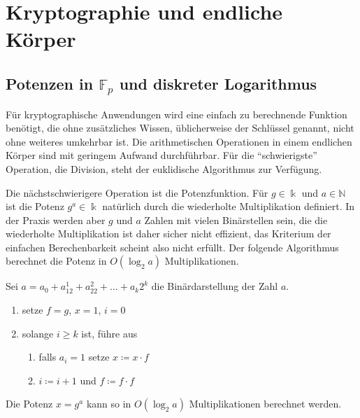 %
%
%

\section{Kryptographie und endliche Körper
\label{buch:section:kryptographie-und-endliche-koerper}}

\subsection{Potenzen in $\mathbb{F}_p$ und diskreter Logarithmus
\label{buch:subsection:potenzen-diskreter-logarithmus}}
Für kryptographische Anwendungen wird eine einfach zu berechnende
Funktion benötigt,
die ohne zusätzliches Wissen, üblicherweise der Schlüssel genannt,
nicht ohne weiteres umkehrbar ist.
Die arithmetischen Operationen in einem endlichen Körper sind
mit geringem Aufwand durchführbar.
Für die ``schwierigste'' Operation, die Division, steht der
euklidische Algorithmus zur Verfügung.

Die nächstschwierigere Operation ist die Potenzfunktion.
Für $g\in \Bbbk$ und $a\in\mathbb{N}$ ist die Potenz $g^a\in\Bbbk$
natürlich durch die wiederholte Multiplikation definiert.
In der Praxis werden aber $g$ und $a$ Zahlen mit vielen Binärstellen
sein, die die wiederholte Multiplikation ist daher sicher nicht
effizient, das Kriterium der einfachen Berechenbarkeit scheint
also nicht erfüllt.
Der folgende Algorithmus berechnet die Potenz in $O(\log_2 a)$
Multiplikationen.

\begin{algorithmus}
\label{buch:crypto:algo:divide-and-conquer}
Sei $a=a_0 + a_12^1 + a_22^2 + \dots + a_k2^k$ die Binärdarstellung
der Zahl $a$.
\begin{enumerate}
\item setze $f=g$, $x=1$, $i=0$
\label{divide-and-conquer-1}
\item solange $i\ge k$ ist, führe aus
\label{divide-and-conquer-2}
\begin{enumerate}
\item
\label{divide-and-conquer-3}
falls $a_i=1$ setze $x \coloneqq x \cdot f$
\item
\label{divide-and-conquer-4}
$i \coloneqq i+1$ und $f\coloneqq f\cdot f$
\end{enumerate}
\end{enumerate}
Die Potenz $x=g^a$ kann so in $O(\log_2a)$ Multiplikationen
berechnet werden.
\end{algorithmus}

